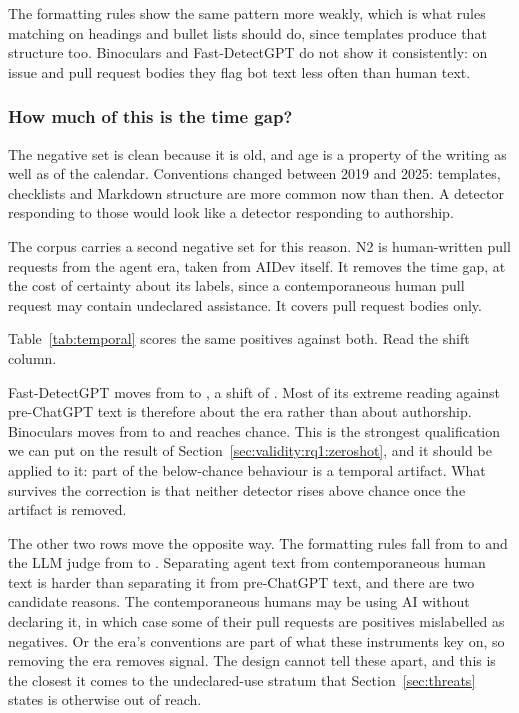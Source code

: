 The formatting rules show the same pattern more weakly, which is what rules matching on
headings and bullet lists should do, since templates produce that structure too.
Binoculars and Fast-DetectGPT do not show it consistently: on issue and pull request
bodies they flag bot text less often than human text.

\subsubsection{How much of this is the time gap?}
\label{sec:validity:rq2:temporal}

The negative set is clean because it is old, and age is a property of the writing as
well as of the calendar. Conventions changed between 2019 and 2025: templates, checklists
and Markdown structure are more common now than then. A detector responding to those
would look like a detector responding to authorship.

The corpus carries a second negative set for this reason. N2 is human-written pull
requests from the agent era, taken from AIDev itself. It removes the time gap, at the
cost of certainty about its labels, since a contemporaneous human pull request may
contain undeclared assistance. It covers pull request bodies only.



Table~\ref{tab:temporal} scores the same positives against both. Read the shift column.

Fast-DetectGPT moves from  to , a shift of
. Most of its extreme reading against pre-ChatGPT text is therefore
about the era rather than about authorship. Binoculars moves from  to
 and reaches chance. This is the strongest qualification we can put on
the result of Section~\ref{sec:validity:rq1:zeroshot}, and it should be applied to it:
part of the below-chance behaviour is a temporal artifact. What survives the correction
is that neither detector rises above chance once the artifact is removed.

The other two rows move the opposite way. The formatting rules fall from
 to  and the LLM judge from  to
. Separating agent text from contemporaneous human text is harder than
separating it from pre-ChatGPT text, and there are two candidate reasons. The
contemporaneous humans may be using AI without declaring it, in which case some of their
pull requests are positives mislabelled as negatives. Or the era's conventions are part
of what these instruments key on, so removing the era removes signal. The design cannot
tell these apart, and this is the closest it comes to the undeclared-use stratum that
Section~\ref{sec:threats} states is otherwise out of reach.

